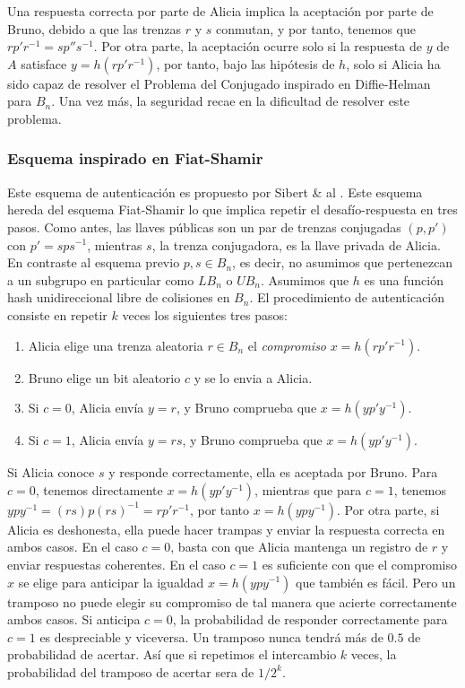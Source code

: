 \documentclass[12pt]{book}
\theoremstyle{definition}
\begin{document}
Una respuesta correcta por parte de Alicia implica la aceptación por parte de Bruno, debido a que las trenzas $r$ y $s$ conmutan, y por tanto, tenemos que $rp'r^{-1}=sp''s^{-1}$. Por otra parte, la aceptación ocurre solo si la respuesta de $y$ de $A$ satisface $y=h(rp'r^{-1})$, por tanto, bajo las hipótesis de $h$, solo si Alicia ha sido capaz de resolver el Problema del Conjugado inspirado en Diffie-Helman para $B_n$. Una vez más, la seguridad recae en la dificultad de resolver este problema.


\subsubsection*{Esquema inspirado en Fiat-Shamir} Este esquema de autenticación es propuesto por Sibert \& al \cite{Sibert}. Este esquema hereda del esquema Fiat-Shamir lo que implica repetir el desafío-respuesta en tres pasos. Como antes, las llaves públicas son un par de trenzas conjugadas $(p,p')$ con $p'=sps^{-1}$, mientras $s$, la trenza conjugadora, es la llave privada de Alicia. En contraste al esquema previo $p,s\in B_n$, es decir, no asumimos que pertenezcan a un subgrupo en particular como $LB_n$ o $UB_n$. Asumimos que $h$ es una función hash unidireccional libre de colisiones en $B_n$. El procedimiento de autenticación consiste en repetir $k$ veces los siguientes tres pasos:

\begin{enumerate}
\item Alicia elige una trenza aleatoria $r\in B_n$ el \textit{compromiso} $x=h(rp'r^{-1})$.
\item Bruno elige un bit aleatorio $c$ y se lo envia a Alicia.
\item Si $c=0$, Alicia envía $y=r$, y Bruno comprueba que $x=h(yp'y^{-1})$.
\item Si $c=1$, Alicia envía $y=rs$, y Bruno comprueba que $x=h(yp'y^{-1})$.
\end{enumerate}

Si Alicia conoce $s$ y responde correctamente, ella es aceptada por Bruno. Para $c=0$, tenemos directamente $x=h(yp'y^{-1})$, mientras que para $c=1$, tenemos $ypy^{-1}=(rs)p(rs)^{-1}=rp'r^{-1}$, por tanto $x=h(ypy^{-1})$. Por otra parte, si Alicia es deshonesta, ella puede hacer trampas y enviar la respuesta correcta en ambos casos. En el caso $c=0$, basta con que Alicia mantenga un registro de $r$ y enviar respuestas coherentes. En el caso $c=1$ es suficiente con que el compromiso $x$ se elige para anticipar la igualdad $x=h(ypy^{-1})$ que también es fácil. Pero un tramposo no puede elegir su compromiso de tal manera que acierte correctamente ambos casos. Si anticipa $c=0$, la probabilidad de responder correctamente para $c=1$ es despreciable y viceversa. Un tramposo nunca tendrá más de $0.5$ de probabilidad de acertar. Así que si repetimos el intercambio $k$ veces, la probabilidad del tramposo de acertar sera de $1/2^k$.
\end{document}

